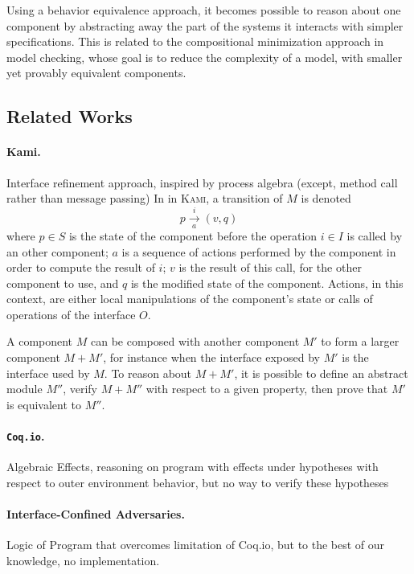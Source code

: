 Using a behavior equivalence approach, it becomes possible to reason about one
component by abstracting away the part of the systems it interacts with simpler
specifications.
%
This is related to the compositional minimization approach  in
model checking, whose goal is to reduce the complexity of a model, with smaller
yet provably equivalent components.

\subsection{Related Works}

\paragraph{Kami.}
%
Interface refinement approach, inspired by process algebra (except, method call
rather than message passing)
%
In in {\scshape Kami}, a transition of $M$ is denoted
%
\[ p \xrightarrow[a]{i} (v, q) \]
%
where $p \in S$ is the state of the component before the operation $i \in I$ is
called by an other component;
%
$a$ is a sequence of actions performed by the component in order to compute the
result of $i$;
%
$v$ is the result of this call, for the other component to use, and $q$ is the
modified state of the component.
%
Actions, in this context, are either local manipulations of the component's
state or calls of operations of the interface $O$.

A component $M$ can be composed with another component $M'$ to form a larger
component $M + M'$, for instance when the interface exposed by $M'$ is the
interface used by $M$.
%
To reason about $M + M'$, it is possible to define an abstract module $M''$,
verify $M + M''$ with respect to a given property, then prove that $M'$ is
equivalent to $M''$.

\paragraph{\texttt{Coq.io}.}
%
Algebraic Effects, reasoning on program with effects under hypotheses with
respect to outer environment behavior, but no way to verify these hypotheses

\paragraph{Interface-Confined Adversaries.}
%
Logic of Program that overcomes limitation of Coq.io, but to the best of our
knowledge, no implementation.

